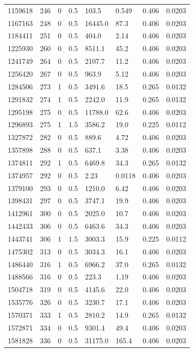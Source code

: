 \documentclass[preview]{standalone}
\begin{document}
{{{\begin{tabular}{L{1.2cm}C{1.2cm} C{0.3cm}C{0.5cm} C{1.4cm}C{1.4cm} C{1.4cm}C{1.4cm}}
  1159618  &   246  & 0     & 0.5 &  103.5  & 0.549  & 0.406 &  0.0203   \\ 
  1167163  &   248  & 0     & 0.5 &  16445.0  & 87.3  & 0.406 &  0.0203   \\ 
  1184411  &   251  & 0     & 0.5 &  404.0  & 2.14  & 0.406 &  0.0203   \\ 
  1225930  &   260  & 0     & 0.5 &  8511.1  & 45.2  & 0.406 &  0.0203   \\ 
  1241749  &   264  & 0     & 0.5 &  2107.7  & 11.2  & 0.406 &  0.0203   \\ 
  1256420  &   267  & 0     & 0.5 &  963.9  & 5.12  & 0.406 &  0.0203   \\ 
  1284506  &   273  & 1     & 0.5 &  3491.6  & 18.5  & 0.265 &  0.0132   \\ 
  1291832  &   274  & 1     & 0.5 &  2242.0  & 11.9  & 0.265 &  0.0132   \\ 
  1295198  &   275  & 0     & 0.5 &  11788.0  & 62.6  & 0.406 &  0.0203   \\ 
  1296893  &   275  & 1     & 1.5 &  3586.2  & 19.0  & 0.225 &  0.0112   \\ 
  1327872  &   282  & 0     & 0.5 &  889.6  & 4.72  & 0.406 &  0.0203   \\ 
  1357898  &   288  & 0     & 0.5 &  637.1  & 3.38  & 0.406 &  0.0203   \\ 
  1374811  &   292  & 1     & 0.5 &  6469.8  & 34.3  & 0.265 &  0.0132   \\ 
  1374957  &   292  & 0     & 0.5 &  2.23  & 0.0118  & 0.406 &  0.0203   \\ 
  1379100  &   293  & 0     & 0.5 &  1210.0  & 6.42  & 0.406 &  0.0203   \\ 
  1398431  &   297  & 0     & 0.5 &  3747.1  & 19.9  & 0.406 &  0.0203   \\ 
  1412961  &   300  & 0     & 0.5 &  2025.0  & 10.7  & 0.406 &  0.0203   \\ 
  1442433  &   306  & 0     & 0.5 &  6463.6  & 34.3  & 0.406 &  0.0203   \\ 
  1443741  &   306  & 1     & 1.5 &  3003.3  & 15.9  & 0.225 &  0.0112   \\ 
  1475302  &   313  & 0     & 0.5 &  3034.3  & 16.1  & 0.406 &  0.0203   \\ 
  1486440  &   316  & 1     & 0.5 &  6966.2  & 37.0  & 0.265 &  0.0132   \\ 
  1488566  &   316  & 0     & 0.5 &  223.3  & 1.19  & 0.406 &  0.0203   \\ 
  1504718  &   319  & 0     & 0.5 &  4145.6  & 22.0  & 0.406 &  0.0203   \\ 
  1535776  &   326  & 0     & 0.5 &  3230.7  & 17.1  & 0.406 &  0.0203   \\ 
  1570371  &   333  & 1     & 0.5 &  2810.2  & 14.9  & 0.265 &  0.0132   \\ 
  1572871  &   334  & 0     & 0.5 &  9301.4  & 49.4  & 0.406 &  0.0203   \\ 
  1581828  &   336  & 0     & 0.5 &  31175.0  & 165.4  & 0.406 &  0.0203   \\ 
\hline 
\end{tabular} 

}}}
\end{document}
